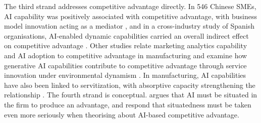 The third strand addresses competitive advantage directly. In 546 Chinese SMEs, AI capability was positively associated with competitive advantage, with business model innovation acting as a mediator \parencite{shao2026}, and in a cross-industry study of Spanish organisations, AI-enabled dynamic capabilities carried an overall indirect effect on competitive advantage \parencite{selgascors2026}. Other studies relate marketing analytics capability and AI adoption to competitive advantage in manufacturing \parencite{hossain2022} and examine how generative AI capabilities contribute to competitive advantage through service innovation under environmental dynamism \parencite{li2025}. In manufacturing, AI capabilities have also been linked to servitization, with absorptive capacity strengthening the relationship \parencite{aboufoul2023}. The fourth strand is conceptual. \textcite{kemp2024} argues that AI must be situated in the firm to produce an advantage, and \textcite{moser2024} respond that situatedness must be taken even more seriously when theorising about AI-based competitive advantage.

